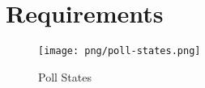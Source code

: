 \section{Requirements}

\begin{figure}[h]
\centering
\texttt{[image: png/poll-states.png]}
\caption{Poll States}
\end{figure}